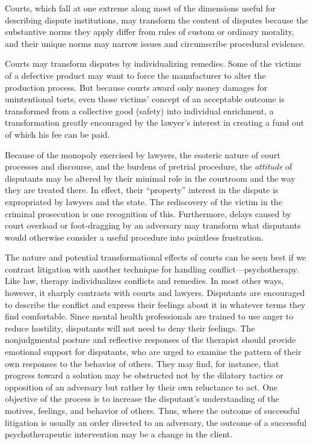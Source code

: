 \documentclass[11pt,letterpaper,twoside]{article}
\begin{document}
Courts, which fall at one extreme along most of the dimensions useful
for describing dispute institutions, may transform the content of
disputes because the substantive norms they apply differ from rules of
custom or ordinary morality, and their unique norms may narrow issues
and circumscribe procedural evidence.

Courts may transform disputes by individualizing remedies. Some of the
victims of a defective product may want to force the manufacturer to
alter the production process. But because courts award only money
damages for unintentional torts, even those victims' concept of an
acceptable outcome is transformed from a collective good (safety) into
individual enrichment, a transformation greatly encouraged by the
lawyer's interest in creating a fund out of which his fee can be paid.

Because of the monopoly exercised by lawyers, the esoteric nature of
court processes and discourse, and the burdens of pretrial procedure,
the \emph{attitude} of disputants may be altered by their minimal role
in the courtroom and the way they are treated there. In effect, their
``property'' interest in the dispute is expropriated by lawyers and the
state. The rediscovery of the victim in the criminal prosecution is one
recognition of this. Furthermore, delays caused by court overload or
foot-dragging by an adversary may transform what disputants would
otherwise consider a useful procedure into pointless frustration.

The nature and potential transformational effects of courts can be seen
best if we contrast litigation with another technique for handling
conflict---psychotherapy. Like law, therapy individualizes conflicts and
remedies. In most other ways, however, it sharply contrasts with courts
and lawyers. Disputants are encouraged to describe the conflict and
express their feelings about it in whatever terms they find comfortable.
Since mental health professionals are trained to use anger to reduce
hostility, disputants will not need to deny their feelings. The
nonjudgmental posture and reflective responses of the therapist should
provide emotional support for disputants, who are urged to examine the
pattern of their own responses to the behavior of others. They may find,
for instance, that progress toward a solution may be obstructed not by
the dilatory tactics or opposition of an adversary but rather by their
own reluctance to act. One objective of the process is to increase the
disputant's understanding of the motives, feelings, and behavior of
others. Thus, where the outcome of successful litigation is usually an
order directed to an adversary, the outcome of a successful
psychotherapeutic intervention may be a change in the client.
\end{document}
